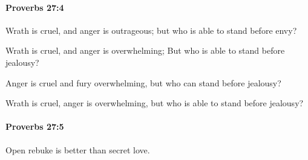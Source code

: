 		\paragraph{Proverbs 27:4} %
			\label{PROVERBS-27-4}

			Wrath is cruel, and anger is outrageous; but who is able to stand before envy?

			\begin{versebox}
					\item[BHS] 
					\item[ASV] Wrath is cruel, and anger is overwhelming; But who is able to stand before jealousy?
					\item[NIV] Anger is cruel and fury overwhelming, but who can stand before jealousy?
					\item[NRSV] Wrath is cruel, anger is overwhelming, but who is able to stand before jealousy?
			\end{versebox}

		\paragraph{Proverbs 27:5} %
			\label{PROVERBS-27-5}

			Open rebuke is better than secret love.

